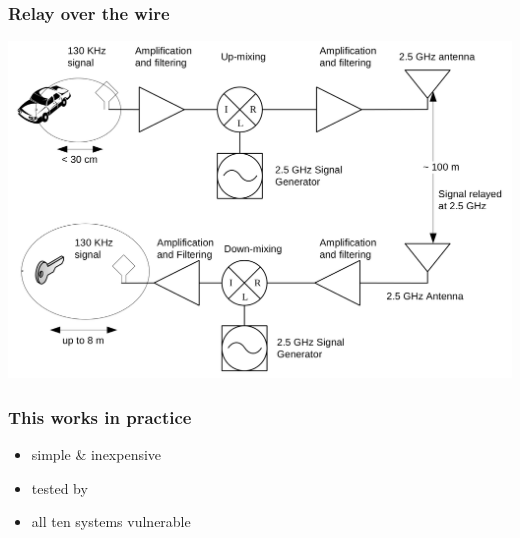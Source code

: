 \documentclass[12pt]{beamer}
\begin{document}
	\begin{frame}
		\frametitle{Relay over the wire}
		\begin{center}
			\includegraphics[scale=0.75]{img/franc_relay_over_the_air.png} 	
		\end{center}
	\end{frame}

	\begin{frame}
		\frametitle{This works in practice}
		\begin{itemize}
			\item simple \& inexpensive
			\item tested by \citet*{relayAttacksFranc}
			\item all ten systems vulnerable
		\end{itemize}
	\end{frame}
\end{document}
